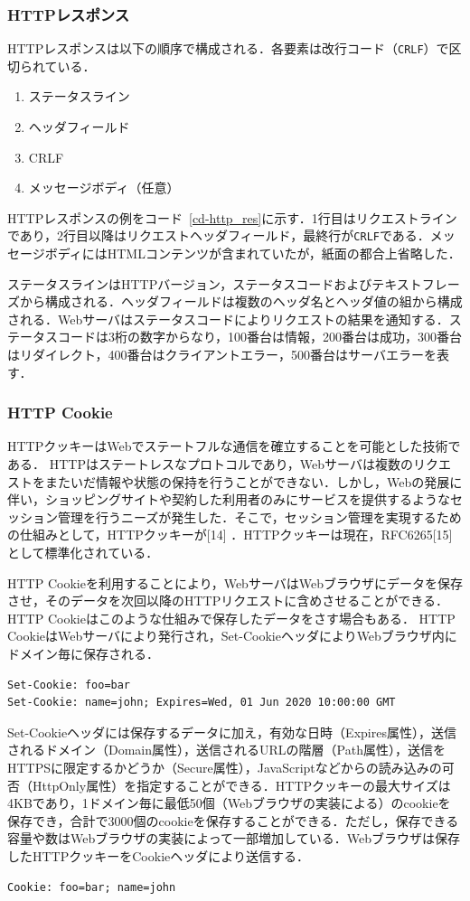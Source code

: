 \subsubsection{HTTPレスポンス}
HTTPレスポンスは以下の順序で構成される．各要素は改行コード（\texttt{CRLF}）で区切られている．
\begin{enumerate}
\item ステータスライン
\item ヘッダフィールド
\item CRLF
\item メッセージボディ（任意）
\end{enumerate}
HTTPレスポンスの例をコード~\ref{cd-http_res}に示す．1行目はリクエストラインであり，2行目以降はリクエストヘッダフィールド，最終行が\texttt{CRLF}である．メッセージボディにはHTMLコンテンツが含まれていたが，紙面の都合上省略した．

ステータスラインはHTTPバージョン，ステータスコードおよびテキストフレーズから構成される．ヘッダフィールドは複数のヘッダ名とヘッダ値の組から構成される．Webサーバはステータスコードによりリクエストの結果を通知する．ステータスコードは3桁の数字からなり，100番台は情報，200番台は成功，300番台はリダイレクト，400番台はクライアントエラー，500番台はサーバエラーを表す．
\subsubsection{HTTP Cookie}
HTTPクッキーはWebでステートフルな通信を確立することを可能とした技術である．
HTTPはステートレスなプロトコルであり，Webサーバは複数のリクエストをまたいだ情報や状態の保持を行うことができない．しかし，Webの発展に伴い，ショッピングサイトや契約した利用者のみにサービスを提供するようなセッション管理を行うニーズが発生した．そこで，セッション管理を実現するための仕組みとして，HTTPクッキーが[14] ．HTTPクッキーは現在，RFC6265[15] として標準化されている． 

HTTP Cookieを利用することにより，WebサーバはWebブラウザにデータを保存させ，そのデータを次回以降のHTTPリクエストに含めさせることができる．HTTP Cookieはこのような仕組みで保存したデータをさす場合もある．
HTTP CookieはWebサーバにより発行され，Set-CookieヘッダによりWebブラウザ内にドメイン毎に保存される．
\begin{verbatim}
Set-Cookie: foo=bar
Set-Cookie: name=john; Expires=Wed, 01 Jun 2020 10:00:00 GMT
\end{verbatim}
Set-Cookieヘッダには保存するデータに加え，有効な日時（Expires属性），送信されるドメイン（Domain属性），送信されるURLの階層（Path属性），送信をHTTPSに限定するかどうか（Secure属性），JavaScriptなどからの読み込みの可否（HttpOnly属性）を指定することができる．HTTPクッキーの最大サイズは4KBであり，1ドメイン毎に最低50個（Webブラウザの実装による）のcookieを保存でき，合計で3000個のcookieを保存することができる．ただし，保存できる容量や数はWebブラウザの実装によって一部増加している．Webブラウザは保存したHTTPクッキーをCookieヘッダにより送信する．
\begin{verbatim}
Cookie: foo=bar; name=john
\end{verbatim}
